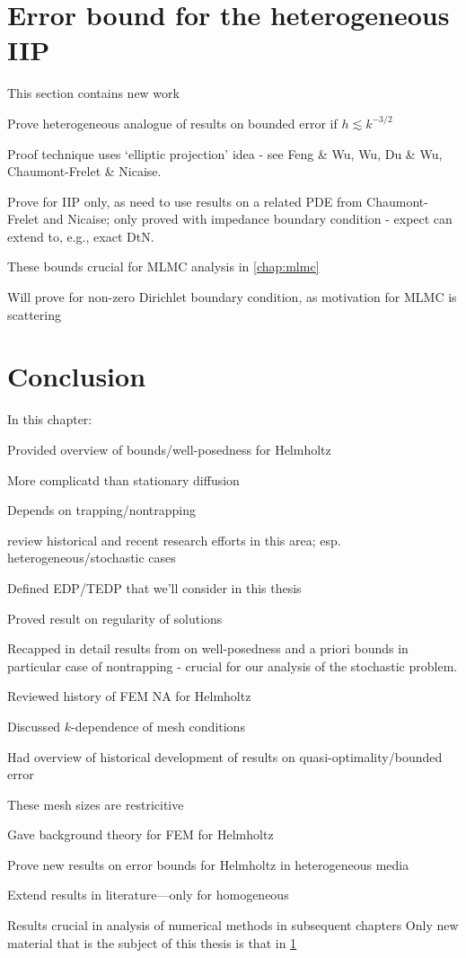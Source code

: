 \section{Error bound for the heterogeneous IIP}\label{sec:errbound}
\bit
\item This section contains new work
\item Prove heterogeneous analogue of results on bounded error if $h \lesssim k^{-3/2}$
\item Proof technique uses `elliptic projection' idea - see Feng \& Wu, Wu, Du \& Wu, Chaumont-Frelet \& Nicaise.
\item Prove for IIP only, as need to use results on a related PDE from Chaumont-Frelet and Nicaise; only proved with impedance boundary condition - expect can extend to, e.g., exact DtN.
\item These bounds crucial for MLMC analysis in \cref{chap:mlmc}
\item Will prove for non-zero Dirichlet boundary condition, as motivation for MLMC is scattering
\eit
\section{Conclusion}
In this chapter:
\bit
\item Provided overview of bounds/well-posedness for Helmholtz
\bit
\item More complicatd than stationary diffusion
\item Depends on trapping/nontrapping
\item review historical and recent research efforts in this area; esp. heterogeneous/stochastic cases
\eit
\item Defined EDP/TEDP that we'll consider in this thesis
\item Proved result on regularity of solutions
\item Recapped in detail results from \cite{GrPeSp:19} on well-posedness and a priori bounds in particular case of nontrapping - crucial for our analysis of the stochastic problem.
\item Reviewed history of FEM NA for Helmholtz
\bit
\item Discussed $k$-dependence of mesh conditions
\item Had overview of historical development of results on quasi-optimality/bounded error
\item These mesh sizes are restricitive
\eit
\item Gave background theory for FEM for Helmholtz
\item Prove new results on error bounds for Helmholtz in heterogeneous media
\bit
\item Extend results in literature---only for homogeneous
\item Results crucial in analysis of numerical methods in subsequent chapters
\eit
Only new material that is the subject of this thesis is that in \cref{sec:errbound}
\eit
{}
